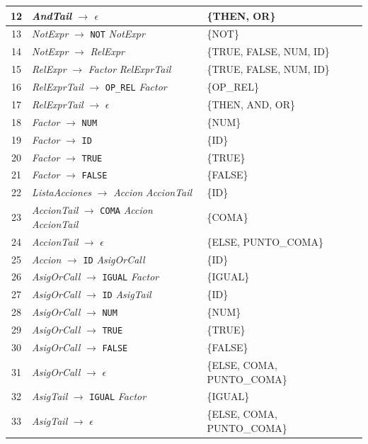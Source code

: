 \documentclass[12pt,a4paper]{article}
\begin{document}
{\begin{longtable}{|c|>{\raggedright\arraybackslash}p{7.2cm}|>{\raggedright\arraybackslash}p{5.2cm}|}
12 & \textit{AndTail} $\to$ $\epsilon$ & \{THEN, OR\}\\ \hline
13 & \textit{NotExpr} $\to$ \texttt{NOT} \textit{NotExpr} & \{NOT\}\\ \hline
14 & \textit{NotExpr} $\to$ \textit{RelExpr} & \{TRUE, FALSE, NUM, ID\}\\ \hline
15 & \textit{RelExpr} $\to$ \textit{Factor} \textit{RelExprTail} & \{TRUE, FALSE, NUM, ID\}\\ \hline
16 & \textit{RelExprTail} $\to$ \texttt{OP\_REL} \textit{Factor} & \{OP\_REL\}\\ \hline
17 & \textit{RelExprTail} $\to$ $\epsilon$ & \{THEN, AND, OR\}\\ \hline
18 & \textit{Factor} $\to$ \texttt{NUM} & \{NUM\}\\ \hline
19 & \textit{Factor} $\to$ \texttt{ID} & \{ID\}\\ \hline
20 & \textit{Factor} $\to$ \texttt{TRUE} & \{TRUE\}\\ \hline
21 & \textit{Factor} $\to$ \texttt{FALSE} & \{FALSE\}\\ \hline
22 & \textit{ListaAcciones} $\to$ \textit{Accion} \textit{AccionTail} & \{ID\}\\ \hline
23 & \textit{AccionTail} $\to$ \texttt{COMA} \textit{Accion} \textit{AccionTail} & \{COMA\}\\ \hline
24 & \textit{AccionTail} $\to$ $\epsilon$ & \{ELSE, PUNTO\_COMA\}\\ \hline
25 & \textit{Accion} $\to$ \texttt{ID} \textit{AsigOrCall} & \{ID\}\\ \hline
26 & \textit{AsigOrCall} $\to$ \texttt{IGUAL} \textit{Factor} & \{IGUAL\}\\ \hline
27 & \textit{AsigOrCall} $\to$ \texttt{ID} \textit{AsigTail} & \{ID\}\\ \hline
28 & \textit{AsigOrCall} $\to$ \texttt{NUM} & \{NUM\}\\ \hline
29 & \textit{AsigOrCall} $\to$ \texttt{TRUE} & \{TRUE\}\\ \hline
30 & \textit{AsigOrCall} $\to$ \texttt{FALSE} & \{FALSE\}\\ \hline
31 & \textit{AsigOrCall} $\to$ $\epsilon$ & \{ELSE, COMA, PUNTO\_COMA\}\\ \hline
32 & \textit{AsigTail} $\to$ \texttt{IGUAL} \textit{Factor} & \{IGUAL\}\\ \hline
33 & \textit{AsigTail} $\to$ $\epsilon$ & \{ELSE, COMA, PUNTO\_COMA\}\\ \hline
\end{longtable}
}
\end{document}
